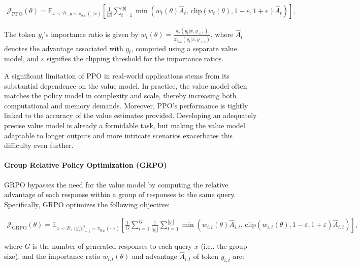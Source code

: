 \begin{align}
\mathcal{J}_\text{PPO}(\theta) = \mathbb{E}_{ x \sim \mathcal{D},\, y \sim \pi_{\theta_\text{old}}( \cdot | x) }
\left[ \frac{1}{|y|} \sum_{t=1}^{|y|} 
\min \left( w_{t}(\theta) \widehat{A}_{t},  \, \mathrm{clip} \left( w_{t}(\theta), 1 - {\varepsilon}, 1 + {\varepsilon}\right) \widehat{A}_{t} \right)
\right],
\end{align}

The token $y_t$'s importance ratio is given by $
w_{t}(\theta) = \frac{ \pi_{\theta} (y_{t} | x, y_{<t}) }{ \pi_{\theta_\text{old}} (y_{t} | x,y_{<t})} $, where $\widehat{A}_{t}$ denotes the advantage associated with $y_t$, computed using a separate value model, and $\varepsilon$ signifies the clipping threshold for the importance ratios.

A significant limitation of PPO in real-world applications stems from its substantial dependence on the value model. In practice, the value model often matches the policy model in complexity and scale, thereby increasing both computational and memory demands. Moreover, PPO's performance is tightly linked to the accuracy of the value estimates provided. Developing an adequately precise value model is already a formidable task, but making the value model adaptable to longer outputs and more intricate scenarios exacerbates this difficulty even further.

\paragraph{Group Relative Policy Optimization (GRPO)} GRPO \citep{grpo} bypasses the need for the value model by computing the relative advantage of each response within a group of responses to the same query. Specifically, GRPO optimizes the following objective:

\begin{align}
\label{equ:grpo}
\mathcal{J}_\text{GRPO}(\theta) = \mathbb{E}_{ x \sim \mathcal{D},\, \{y_i\}_{i=1}^G \sim \pi_{\theta_\text{old}}( \cdot | x) }
\left[ \frac{1}{G} \sum_{i=1}^{G} \frac{1}{|y_i|} \sum_{t=1}^{|y_i|} 
\min \left( w_{i,t}(\theta) \widehat{A}_{i,t},  \, \mathrm{clip} \left( w_{i,t}(\theta), 1 - {\varepsilon}, 1 + {\varepsilon}\right) \widehat{A}_{i,t} \right)
\right],
\end{align}

where $G$ is the number of generated responses to each query $x$ (i.e., the group size), and the importance ratio $w_{i,t}(\theta)$ and advantage $\widehat{A}_{i,t}$ of token $y_{i,t}$ are:

